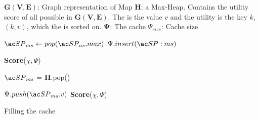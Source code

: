 
\begin{algorithm}[H!bt]
\dontprintsemicolon
\SetVline


\KwData
{

	$\mathbf{G(V,E)}$: Graph representation of Map \;
	\textbf{H}: a Max-Heap. Contains the utility score of all possible \spaths in $\mathbf{G(V,E)}$. The \spath is the value $v$ and the utility is the key $k$, $(k, v)$, which the is sorted on.\;
	$\mathbf{\Psi}$: The cache \;
	$\Psi_{size}$: Cache size \;
}

{
	$\spath_{ms} \leftarrow pop(\spath_{as}.max)$  \; 
	{
		$\Psi.insert(\spath:{ms})$\;
	}
}

\textbf{Score}($\chi, \Psi$) \;

{
	$\spath_{ms}$ = \textbf{H}.pop() \; 
	{
		$\Psi.push(\spath_{ms}.v)$\;
		\textbf{Score}($\chi, \Psi$) \;
		
	}
}

\caption{Filling the cache}
\label{alg:greedy}
\end{algorithm}